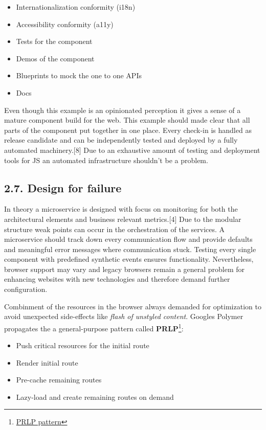 \documentclass[]{article}
\providecommand{\tightlist}{%
  \setlength{\itemsep}{0pt}\setlength{\parskip}{0pt}}
\begin{document}
\begin{itemize}
\tightlist
\item
  Internationalization conformity (i18n)
\item
  Accessibility conformity (a11y)
\item
  Tests for the component
\item
  Demos of the component
\item
  Blueprints to mock the one to one APIs
\item
  Docs
\end{itemize}

Even though this example is an opinionated perception it gives a sense
of a mature component build for the web. This example should made clear
that all parts of the component put together in one place. Every
check-in is handled as release candidate and can be independently tested
and deployed by a fully automated machinery.{[}8{]} Due to an exhaustive
amount of testing and deployment tools for JS an automated
infrastructure shouldn't be a problem.

\subsection{2.7. Design for failure}\label{design-for-failure}

In theory a microservice is designed with focus on monitoring for both
the architectural elements and business relevant metrics.{[}4{]} Due to
the modular structure weak points can occur in the orchestration of the
services. A microservice should track down every communication flow and
provide defaults and meaningful error messages where communication
stuck. Testing every single component with predefined synthetic events
ensures functionality. Nevertheless, browser support may vary and legacy
browsers remain a general problem for enhancing websites with new
technologies and therefore demand further configuration.

Combinment of the resources in the browser always demanded for
optimization to avoid unexpected side-effects like \emph{flash of
unstyled content}. Googles Polymer propagates the a general-purpose
pattern called \textbf{PRLP}\footnote{\href{https://www.polymer-project.org/1.0/toolbox/server}{PRLP
  pattern}}:

\begin{itemize}
\tightlist
\item
  Push critical resources for the initial route
\item
  Render initial route
\item
  Pre-cache remaining routes
\item
  Lazy-load and create remaining routes on demand
\end{itemize}
\end{document}
